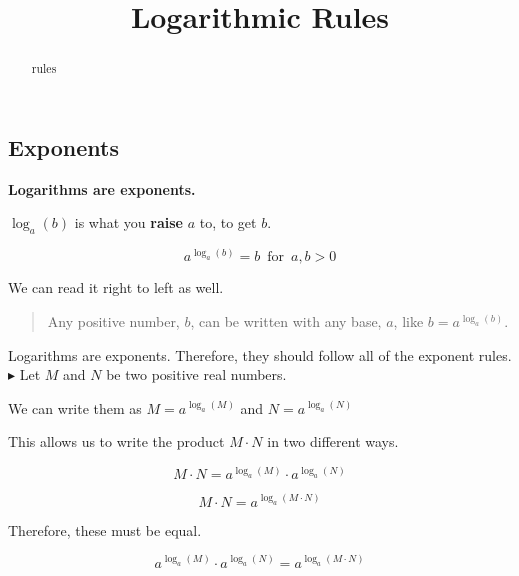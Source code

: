 \documentclass{ximera}
\title{Logarithmic Rules}
\begin{document}
\begin{abstract}
rules
\end{abstract}
\maketitle
















\subsection*{Exponents}



\begin{center}
\textbf{\textcolor{red!70!darkgray}{Logarithms are exponents.}}
\end{center}

$\log_a(b)$ is what you \textbf{\textcolor{red!70!darkgray}{raise}} $a$ to, to get $b$.

\[    a^{\log_a(b)}  = b    \, \text{ for } \,  a,b > 0     \]


We can read it right to left as well.  


\begin{quote}
Any positive number, $b$, can be written with any base, $a$, like $b = a^{\log_a(b)}$.
\end{quote}



Logarithms are exponents. Therefore, they should follow all of the exponent rules. \\



$\blacktriangleright$  Let $M$ and $N$ be two positive real numbers.

We can write them as $M = a^{\log_a(M)}$ and $N = a^{\log_a(N)}$


This allows us to write the product $M \cdot N$ in two different ways.



\[   M \cdot N = a^{\log_a(M)} \cdot a^{\log_a(N)}                    \]

\[   M \cdot N = a^{\log_a(M \cdot N)}                  \]


Therefore, these must be equal.


\[    a^{\log_a(M)} \cdot a^{\log_a(N)}     =   a^{\log_a(M \cdot N)}                \]
\end{document}
